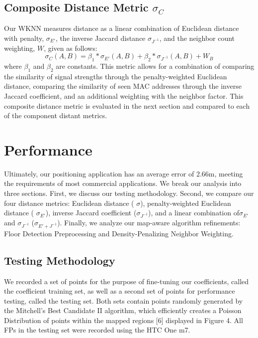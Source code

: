 \documentclass[conference]{IEEEtran}
\begin{document}
\subsection{Composite Distance Metric $\sigma_C$}
\indent Our WKNN measures distance as a linear combination of Euclidean distance with penalty, $\sigma_{E'}$,  the inverse Jaccard distance $\sigma_{J^{-1}}$, and the neighbor count weighting, $W$,  given as follows:
\begin{equation}
\label{composite}
\sigma_C(A, B)=\beta_1*\sigma_{E'}(A, B)+\beta_2*\sigma_{J^{-1}}(A, B)+W_B
\end{equation}
where $\beta_1$ and $\beta_2$ are constants. This metric allows for a combination of comparing the similarity of signal strengths through the penalty-weighted Euclidean distance, comparing the similarity of seen MAC addresses through the inverse Jaccard coefficient, and an additional weighting with the neighbor factor. This composite distance metric is evaluated in the next section and compared to each of the component distant metrics.

\section{Performance}

Ultimately, our positioning application has an average error of 2.66m, meeting the requirements of most commercial applications. We break our analysis into three sections. First, we discuss our testing methodology. Second, we compare our four distance metrics: Euclidean distance ( $\sigma$), penalty-weighted Euclidean distance ( $\sigma_{E'}$), inverse Jaccard coefficient ($\sigma_{J^{-1}}$), and a linear combination of$\sigma_{E'}$ and $\sigma_{J^{-1}}$ ($\sigma_{E' + J^{-1}}$). Finally, we analyze our map-aware algorithm refinements: Floor Detection Preprocessing and Density-Penalizing Neighbor Weighting.

\subsection{Testing Methodology}
We recorded a set of points for the purpose of fine-tuning our coefficients, called the coefficient training set, as well as a second set of points for performance testing, called the testing set. Both sets contain points randomly generated by the Mitchell's Best Candidate II algorithm, which efficiently creates a Poisson Distribution of points within the mapped regions [6] displayed in Figure 4. All FPs in the testing set were recorded using the HTC One m7. 
\end{document}
